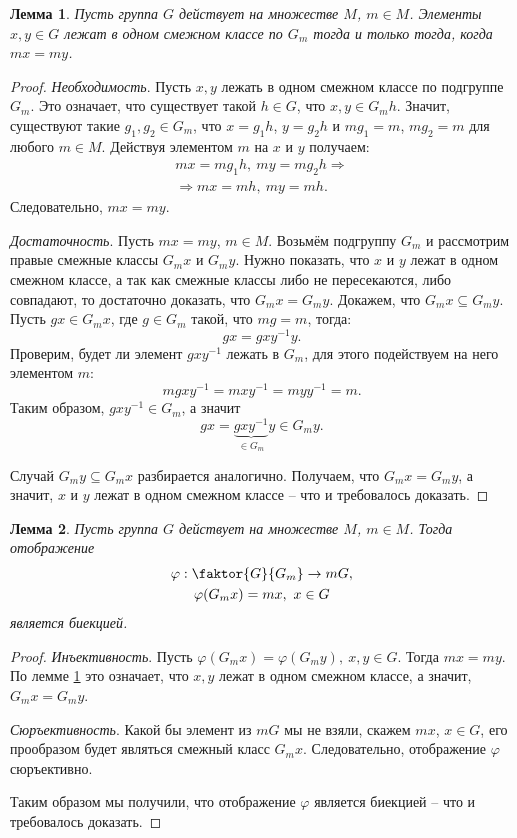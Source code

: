 \documentclass{article}
\newtheorem{lemma}{Лемма}[section]
\begin{document}
\begin{lemma} \label{zfdsa}
    Пусть группа $G$ действует на множестве $M$, $m \in M$. Элементы $x, y \in G$ лежат в одном смежном классе по $G_m$ тогда и только тогда, когда $mx = my$.
\end{lemma}
\begin{proof}
    \textit{Необходимость}. Пусть $x, y$ лежать в одном смежном классе по подгруппе $G_m$. Это означает, что существует такой $h \in G$, что $x, y \in G_m h$. Значит, существуют такие $g_1, g_2 \in G_m$, что $x = g_1 h$, $y = g_2 h$ и $m g_1 = m$, $m g_2 = m$ для любого $m \in M$.
    Действуя элементом $m$ на $x$ и $y$ получаем:
    \begin{gather*}
        mx = mg_1 h, \ my = mg_2 h \Rightarrow \\
        \Rightarrow mx = mh, \ my = mh.
    \end{gather*}
    Следовательно, $mx = my$.

    \textit{Достаточность}. Пусть $mx = my$, $m \in M$. Возьмём подгруппу $G_m$ и рассмотрим правые смежные классы $G_m x$ и $G_m y$. Нужно показать, что $x$ и $y$ лежат в одном смежном классе, а так как смежные классы либо не пересекаются, либо совпадают, то достаточно доказать, что $G_m x = G_m y$.
    Докажем, что $G_m x \subseteq G_m y$. Пусть $g x \in G_m x$, где $g \in G_m$ такой, что $m g = m$, тогда: $$ g x = g x y^{-1} y. $$ Проверим, будет ли элемент $g x y^{-1}$ лежать в $G_m$, для этого подействуем на него элементом $m$: $$ m g x y^{-1} = m x y^{-1} = m y y^{-1} = m. $$ Таким образом, $g x y^{-1} \in G_m$, а значит $$ g x = \underbrace{g x y^{-1}}_{\in G_m} y \in G_m y. $$

    Случай $G_m y \subseteq G_m x$ разбирается аналогично. Получаем, что $G_m x = G_m y$, а значит, $x$ и $y$ лежат в одном смежном классе -- что и требовалось доказать.
\end{proof}

\begin{lemma}
    Пусть группа $G$ действует на множестве $M$, $m \in M$. Тогда отображение
    \begin{gather*}
        \varphi: \faktor{G}{G_m} \rightarrow mG,  \\
        \varphi(G_m x) = m x, \ x \in G
    \end{gather*}
    является биекцией.
\end{lemma}
\begin{proof}
    \textit{Инъективность}. Пусть $\varphi(G_m x) = \varphi(G_m y), \ x, y \in G$. Тогда $mx = my$. По лемме \ref{zfdsa} это означает, что $x, y$ лежат в одном смежном классе, а значит, $G_m x = G_m y$.

    \textit{Сюръективность}. Какой бы элемент из $mG$ мы не взяли, скажем $mx$, $x \in G$, его прообразом будет являться смежный класс $G_m x$. Следовательно, отображение $\varphi$ сюръективно.

    Таким образом мы получили, что отображение $\varphi$ является биекцией -- что и требовалось доказать.
\end{proof}
\end{document}
